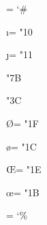 \def \greater {%
  \ensurepar
  \if \monoencodingp
    \char "3E\relax
  \else
    \PSgreater
  \fi}

\def \>{%
  \relax
  \if \mathmodep \plainerror \else \greater \fi}

\chardef \hash = `\#                    %

\let \# = \hash

\def \hat {%
  \ensurepar
  \if \mathmodep
    \zmhat
  \else
    \char "5E\relax
  \fi}

\chardef \i = "10                       %

\chardef \j = "11                       %

\def \L {\PSpolishL}                    %

\def \l {\PSpolishl}                    %


\def \lbrace {%
  \relax
  \if \mathmodep
    \zmlbrace
  \else \if \monoencodingp
    \char "7B\relax
  \else
    \PSbraceleft
  \fi\fi}

\let \{ = \lbrace

\def \less {%
  \ensurepar
  \if \monoencodingp
    \char "3C\relax
  \else
    \PSless
  \fi}

\let \< = \less

\chardef \O = "1F                       %

\chardef \o = "1C                       %

\chardef \OE = "1E                      %

\chardef \oe = "1B                      %

\def \odquote {``}                      %

\def \P {%
  \ensurepar
  \PSparagraph}

\chardef \percent = `\%                 %

